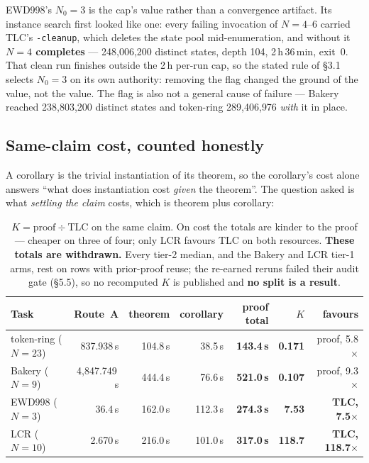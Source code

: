 \documentclass[11pt,a4paper]{article}
\begin{document}
\noindent
EWD998's $N_0 = 3$ is the cap's value rather than a convergence artifact. Its instance search first
looked like one: every failing invocation of $N=4$--$6$ carried TLC's \texttt{-cleanup}, which deletes
the state pool mid-enumeration, and without it \textbf{$N{=}4$ completes} --- 248{,}006{,}200 distinct
states, depth 104, 2\,h\,36\,min, exit~0. That clean run finishes outside the 2\,h per-run cap, so the
stated rule of \S3.1 selects $N_0 = 3$ on its own authority: removing the flag changed the ground of the
value, not the value. The flag is also not a general cause of failure --- Bakery reached 238{,}803{,}200
distinct states and token-ring 289{,}406{,}976 \emph{with} it in place.

\subsection{Same-claim cost, counted honestly}

A corollary is the trivial instantiation of its theorem, so the corollary's cost alone answers ``what
does instantiation cost \emph{given} the theorem''. The question asked is what \emph{settling the
claim} costs, which is theorem plus corollary:

\begin{table}[htbp]
\centering
\small
\begin{tabular}{@{}lrrrrrr@{}}
\toprule
Task & Route~A & theorem & corollary & \textbf{proof total} & \textbf{$K$} & favours \\
\midrule
token-ring ($N{=}23$) & 837.938\,s & 104.8\,s & 38.5\,s & \textbf{143.4\,s} & \textbf{0.171} & proof, 5.8$\times$ \\
Bakery ($N{=}9$)      & 4{,}847.749\,s & 444.4\,s & 76.6\,s & \textbf{521.0\,s} & \textbf{0.107} & proof, 9.3$\times$ \\
EWD998 ($N{=}3$)      & 36.4\,s & 162.0\,s & 112.3\,s & \textbf{274.3\,s} & \textbf{7.53} & \textbf{TLC, 7.5$\times$} \\
LCR ($N{=}10$)        & 2.670\,s & 216.0\,s & 101.0\,s & \textbf{317.0\,s} & \textbf{118.7} & \textbf{TLC, 118.7$\times$} \\
\bottomrule
\end{tabular}
\caption{$K = \text{proof} \div \text{TLC}$ on the same claim. On cost the
totals are kinder to the proof --- cheaper on three of four; only LCR favours TLC on both resources.
\textbf{These totals are withdrawn.} Every tier-2 median, and the Bakery and LCR tier-1 arms, rest on rows
with prior-proof reuse; the re-earned reruns failed their audit gate (\S5.5), so no recomputed $K$ is
published and \textbf{no split is a result}.}
\end{table}
\end{document}
